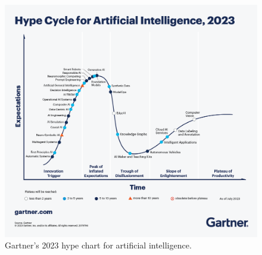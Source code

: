 \begin{figure}[!htp]
    \centering
    \includegraphics[width=\textwidth]{fig/intro/Gartner_2023.png}
    \caption{Gartner's 2023 hype chart for artificial intelligence.}
    \label{fig:garter-chart}
\end{figure}

